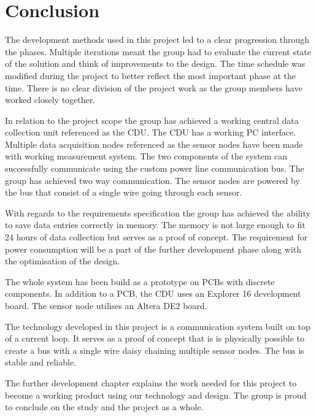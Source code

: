 \chapter{Conclusion}
The development methods used in this project led to a clear progression through the phases. Multiple iterations meant the group had to evaluate the current state of the solution and think of improvements to the design. The time schedule was modified during the project to better reflect the most important phase at the time. There is no clear division of the project work as the group members have worked closely together.

In relation to the project scope the group has achieved a working central data collection unit referenced as the CDU. The CDU has a working PC interface. Multiple data acquisition nodes referenced as the sensor nodes have been made with working measurement system. The two components of the system can successfully communicate using the custom power line communication bus. The group has achieved two way communication. The sensor nodes are powered by the bus that consist of a single wire going through each sensor.

With regards to the requirements specification the group has achieved the ability to save data entries correctly in memory. The memory is not large enough to fit 24 hours of data collection but serves as a proof of concept. The requirement for power consumption will be a part of the further development phase along with the optimisation of the design.

The whole system has been build as a prototype on PCBs with discrete components. In addition to a PCB, the CDU uses an Explorer 16 development board. The sensor node utilises an Altera DE2 board.

The technology developed in this project is a communication system built on top of a current loop. It serves as a proof of concept that is is physically possible to create a bus with a single wire daisy chaining multiple sensor nodes. The bus is stable and reliable. 

The further development chapter explains the work needed for this project to become a working product using our technology and design. The group is proud to conclude on the study and the project as a whole.